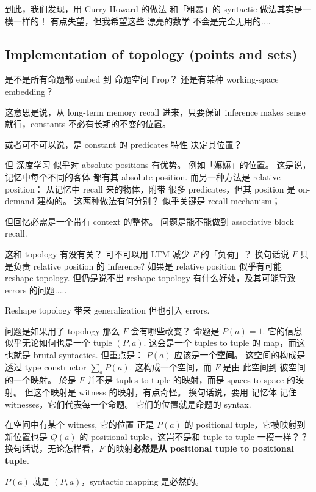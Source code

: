 到此，我们发现，用 Curry-Howard 的做法 和「粗暴」的 syntactic 做法其实是一模一样的！ 有点失望，但我希望这些 漂亮的数学 不会是完全无用的....

\subsection{Implementation of topology (points and sets)}

是不是所有命题都 embed 到 命题空间 $\mathbb{P}\mathrm{rop}$？  还是有某种 working-space embedding？

这意思是说，从 long-term memory recall 进来，只要保证 inference makes sense 就行，constants 不必有长期的不变的位置。

或者可不可以说，是 constant 的 predicates 特性 决定其位置？

但 深度学习 似乎对 absolute positions 有优势。 例如「嫲嫲」的位置。 这是说，记忆中每个不同的客体 都有其 absolute position.  而另一种方法是 relative position： 从记忆中 recall 来的物体，附带 很多 predicates，但其 position 是 on-demand 建构的。 这两种做法有何分别？ 似乎关键是 recall mechanism；

但回忆必需是一个带有 context 的整体。 问题是能不能做到 associative block recall.

这和 topology 有没有关？ 可不可以用 LTM 减少 $F$ 的「负荷」？ 换句话说 $F$ 只是负责 relative position 的 inference?  如果是 relative position 似乎有可能 reshape topology.  但仍是说不出 reshape topology 有什么好处，及其可能导致 errors 的问题.....

Reshape topology 带来 generalization 但也引入 errors.  

问题是如果用了 topology 那么 $F$ 会有哪些改变？  命题是 $P(a) = 1$.  它的信息 似乎无论如何也是一个 tuple $(P,a)$.  这会是一个 tuples to tuple 的 map，而这也就是 brutal syntactics.  但重点是： $P(a)$ 应该是一个\textbf{空间}。 这空间的构成是透过 type constructor $\displaystyle \sum_a P(a)$.  这构成一个空间，而 $F$ 是由 此空间到 彼空间 的一个映射。 於是 $F$ 并不是 tuples to tuple 的映射，而是 spaces to space 的映射。 
但这个映射是 witness 的映射，有点奇怪。 换句话说，要用 记忆体 记住 witnesses，它们代表每一个命题。 它们的位置就是命题的 syntax.  

在空间中有某个 witness, 它的位置 正是 $P(a)$ 的 positional tuple，它被映射到新位置也是 $Q(a)$ 的 positional tuple，这岂不是和 tuple to tuple 一模一样？？  换句话说，无论怎样看，$F$ 的映射\textbf{必然是从 positional tuple to positional tuple}.

$P(a)$ 就是 $(P,a)$，syntactic mapping 是必然的。

